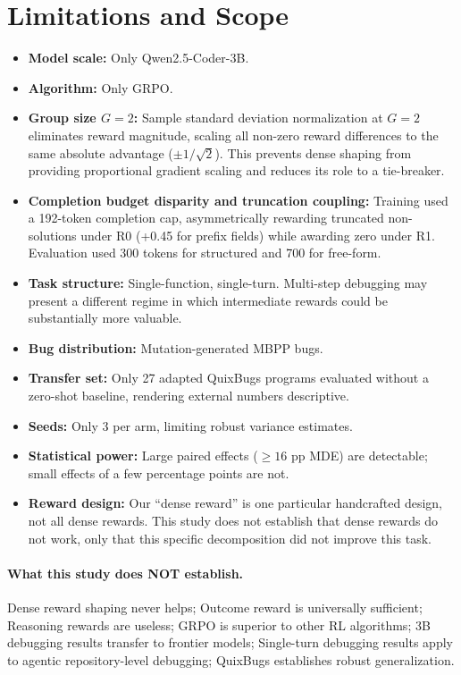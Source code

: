 \documentclass{article}
\begin{document}
\section{Limitations and Scope}
\begin{itemize}
\item \textbf{Model scale:} Only Qwen2.5-Coder-3B.
\item \textbf{Algorithm:} Only GRPO.
\item \textbf{Group size $G=2$:} Sample standard deviation normalization at $G=2$ eliminates reward magnitude, scaling all non-zero reward differences to the same absolute advantage ($\pm 1/\sqrt{2}$). This prevents dense shaping from providing proportional gradient scaling and reduces its role to a tie-breaker.
\item \textbf{Completion budget disparity and truncation coupling:} Training used a 192-token completion cap, asymmetrically rewarding truncated non-solutions under R0 (+0.45 for prefix fields) while awarding zero under R1. Evaluation used 300 tokens for structured and 700 for free-form.
\item \textbf{Task structure:} Single-function, single-turn. Multi-step debugging may present a different regime in which intermediate rewards could be substantially more valuable.
\item \textbf{Bug distribution:} Mutation-generated MBPP bugs.
\item \textbf{Transfer set:} Only 27 adapted QuixBugs programs evaluated without a zero-shot baseline, rendering external numbers descriptive.
\item \textbf{Seeds:} Only 3 per arm, limiting robust variance estimates.
\item \textbf{Statistical power:} Large paired effects ($\ge 16$ pp MDE) are detectable; small effects of a few percentage points are not.
\item \textbf{Reward design:} Our ``dense reward'' is one particular handcrafted design, not all dense rewards. This study does not establish that dense rewards do not work, only that this specific decomposition did not improve this task.
\end{itemize}

\paragraph{What this study does NOT establish.}
Dense reward shaping never helps; Outcome reward is universally sufficient; Reasoning rewards are useless; GRPO is superior to other RL algorithms; 3B debugging results transfer to frontier models; Single-turn debugging results apply to agentic repository-level debugging; QuixBugs establishes robust generalization.
\end{document}
